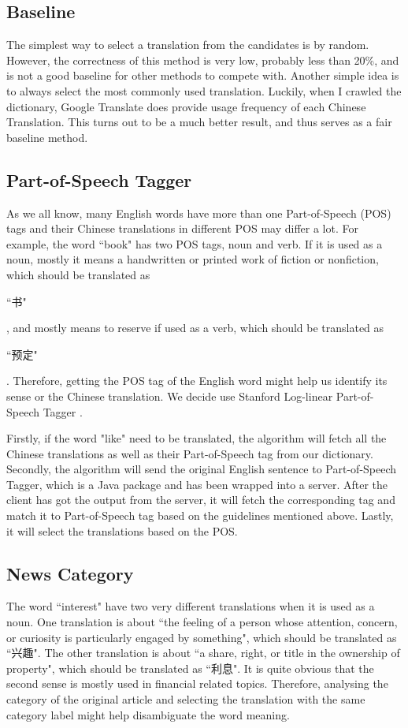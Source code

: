 \begin{CJK}{UTF8}{gbsn}
\subsection{Baseline}
The simplest way to select a translation from the candidates is by random. However, the correctness of this method is very low, probably less than 20\%, and is not a good baseline for other methods to compete with. Another simple idea is to always select the most commonly used translation. Luckily, when I crawled the dictionary, Google Translate does provide usage frequency of each Chinese Translation.  This turns out to be a much better result, and thus serves as a fair baseline method.

\subsection{Part-of-Speech Tagger}
As we all know, many English words have more than one Part-of-Speech (POS) tags and their Chinese translations in different POS may differ a lot. For example, the word ``book" has two POS tags, noun and verb. If it is used as a noun, mostly it means a handwritten or printed work of fiction or nonfiction, which should be translated as \begin{CJK}{UTF8}{gbsn}``书"\end{CJK}, and mostly means to reserve if used as a verb, which should be translated as \begin{CJK}{UTF8}{gbsn}``预定"\end{CJK}. Therefore, getting the POS tag of the English word might help us identify its sense or the Chinese translation. We decide use Stanford Log-linear Part-of-Speech Tagger \cite{Toutanova2003}.

Firstly, if the word "like" need to be translated, the algorithm will fetch all the Chinese translations as well as their Part-of-Speech tag from our dictionary. Secondly, the algorithm will send the original English sentence to Part-of-Speech Tagger, which is a Java package and has been wrapped into a server. After the client has got the output from the server, it will fetch the corresponding tag and match it to Part-of-Speech tag based on the guidelines mentioned above. Lastly, it will select the translations based on the POS.

\subsection{News Category}
The word ``interest" have two very different translations when it is used as a noun. One translation is about ``the feeling of a person whose attention, concern, or curiosity is particularly engaged by something", which should be translated as ``兴趣". The other translation is about ``a share, right, or title in the ownership of property", which should be translated as ``利息". It is quite obvious that the second sense is mostly used in financial related topics. Therefore, analysing the category of the original article and selecting the translation with the same category label might help disambiguate the word meaning.


\end{CJK}

